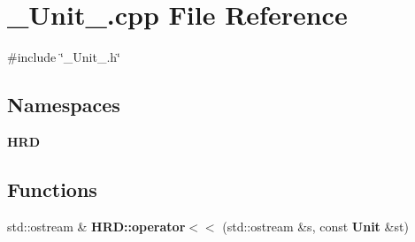 \section{\+\_\+\+Unit\+\_\+.\+cpp File Reference}
\label{___unit___8cpp}
{\ttfamily \#include \char`\"{}\+\_\+\+Unit\+\_\+.\+h\char`\"{}}\newline
\subsection*{Namespaces}
\begin{DoxyCompactItemize}
\item 
 \textbf{ H\+RD}
\end{DoxyCompactItemize}
\subsection*{Functions}
\begin{DoxyCompactItemize}
\item 
std\+::ostream \& \textbf{ H\+R\+D\+::operator$<$$<$} (std\+::ostream \&s, const \textbf{ Unit} \&st)
\end{DoxyCompactItemize}
